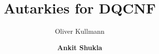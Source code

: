 \documentclass[xcolor=table	]{beamer}
\title[QBF]{Autarkies for DQCNF}
\author{Oliver Kullmann \inst{1} \and \textbf{Ankit Shukla} \inst{2}}
\institute{\inst{1} Swansea university \inst{2} JKU, Austria}
\begin{document}
\begin{frame}
  \titlepage
\end{frame}

% 
% 
% 
% 
% 

%
%
%
%  
\end{document}
